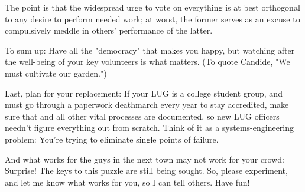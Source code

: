The point is that the widespread urge to vote on everything is at best
orthogonal to any desire to perform needed work; at worst, the former
serves as an excuse to compulsively meddle in others' performance
of the latter.

To sum up:  Have all the "democracy" that makes you happy, but watching after
the well-being of your key volunteers is what matters.  (To quote Candide, 
"We must cultivate our garden.")

Last, plan for your replacement:  If your LUG is a college student
group, and must go through a paperwork deathmarch every year to stay
accredited, make sure that and all other vital processes are documented,
so new LUG officers needn't figure everything out from scratch.  Think
of it as a systems-engineering problem:  You're trying to eliminate
single points of failure.

And what works for the guys in the next town may not work for your crowd:
Surprise!  The keys to this puzzle are still being sought.  So, please
experiment, and let me know what works for you, so I can tell others.
Have fun!

